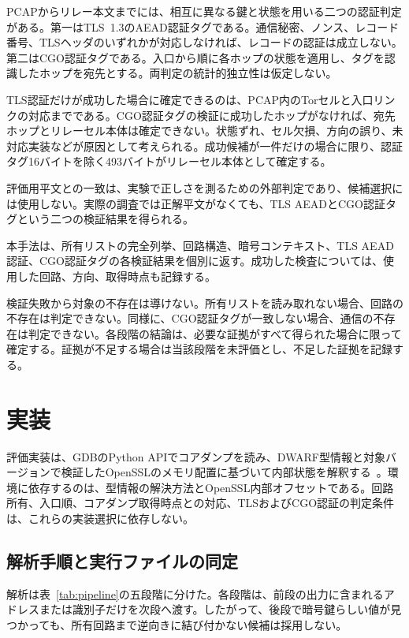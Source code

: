 \documentclass[10pt,a4paper]{ltjsarticle}
\begin{document}
PCAPからリレー本文までには、相互に異なる鍵と状態を用いる二つの認証判定がある。第一はTLS~1.3のAEAD認証タグである。通信秘密、ノンス、レコード番号、TLSヘッダのいずれかが対応しなければ、レコードの認証は成立しない。第二はCGO認証タグである。入口から順に各ホップの状態を適用し、タグを認識したホップを宛先とする。両判定の統計的独立性は仮定しない。

TLS認証だけが成功した場合に確定できるのは、PCAP内のTorセルと入口リンクの対応までである。CGO認証タグの検証に成功したホップがなければ、宛先ホップとリレーセル本体は確定できない。状態ずれ、セル欠損、方向の誤り、未対応実装などが原因として考えられる。成功候補が一件だけの場合に限り、認証タグ16バイトを除く493バイトがリレーセル本体として確定する。

評価用平文との一致は、実験で正しさを測るための外部判定であり、候補選択には使用しない。実際の調査では正解平文がなくても、TLS AEADとCGO認証タグという二つの検証結果を得られる。

\enlargethispage{2\baselineskip}

本手法は、所有リストの完全列挙、回路構造、暗号コンテキスト、TLS AEAD認証、CGO認証タグの各検証結果を個別に返す。成功した検査については、使用した回路、方向、取得時点も記録する。

検証失敗から対象の不存在は導けない。所有リストを読み取れない場合、回路の不存在は判定できない。同様に、CGO認証タグが一致しない場合、通信の不存在は判定できない。各段階の結論は、必要な証拠がすべて得られた場合に限って確定する。証拠が不足する場合は当該段階を未評価とし、不足した証拠を記録する。

\section{実装}\label{sec:implementation}

評価実装は、GDBのPython APIでコアダンプを読み、DWARF型情報と対象バージョンで検証したOpenSSLのメモリ配置に基づいて内部状態を解釈する~\cite{gdbcorepython,dwarf5,openssl3022}。環境に依存するのは、型情報の解決方法とOpenSSL内部オフセットである。回路所有、入口順、コアダンプ取得時点との対応、TLSおよびCGO認証の判定条件は、これらの実装選択に依存しない。

\subsection{解析手順と実行ファイルの同定}

解析は表~\ref{tab:pipeline}の五段階に分けた。各段階は、前段の出力に含まれるアドレスまたは識別子だけを次段へ渡す。したがって、後段で暗号鍵らしい値が見つかっても、所有回路まで逆向きに結び付かない候補は採用しない。
\end{document}
